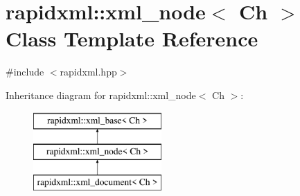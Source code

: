 \hypertarget{singletonrapidxml_1_1xml__node}{\section{rapidxml\+:\+:xml\+\_\+node$<$ Ch $>$ Class Template Reference}
\label{singletonrapidxml_1_1xml__node}
}


{\ttfamily \#include $<$rapidxml.\+hpp$>$}

Inheritance diagram for rapidxml\+:\+:xml\+\_\+node$<$ Ch $>$\+:\begin{figure}[H]
\begin{center}
\leavevmode
\includegraphics[height=3.000000cm]{singletonrapidxml_1_1xml__node}
\end{center}
\end{figure}
